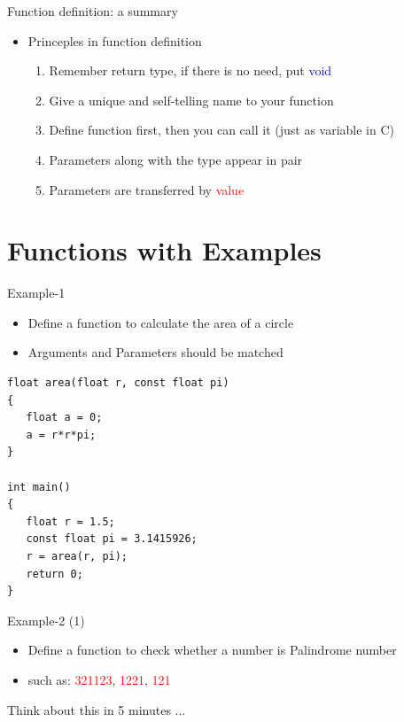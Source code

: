 \begin{frame}[fragile]{Function definition: a summary}
\LARGE{
\begin{itemize}
	\item {Princeples in function definition}
	\begin{enumerate}
		\item {Remember return type, if there is no need, put \textcolor{blue}{void}}
		\item {Give a unique and self-telling name to your function}
		\item {Define function first, then you can call it (just as variable in C)}
		\item {Parameters along with the type appear in pair}
		\item {Parameters are transferred by \textcolor{red}{value}}
	\end{enumerate}
\end{itemize}
}
\end{frame}

\section{Functions with Examples}
\label{sec:example}
\begin{frame}[fragile]{Example-1}
\begin{itemize}
	\item {Define a function to calculate the area of a circle}
	\item {Arguments and Parameters should be matched}
\end{itemize}
\begin{lstlisting}
float area(float r, const float pi)
{
   float a = 0;
   a = r*r*pi;
}

int main()
{
   float r = 1.5;
   const float pi = 3.1415926;
   r = area(r, pi);
   return 0;
}
\end{lstlisting}
\end{frame}

\begin{frame}[fragile]{Example-2 (1)}
\begin{itemize}
	\item {Define a function to check whether a number is Palindrome number}
	\item {such as: \textcolor{red}{321123}, \textcolor{red}{1221}, \textcolor{red}{121}}
\end{itemize}
\begin{center}
	\Large{
	Think about this in 5 minutes ...
	}
\end{center}
\end{frame}

